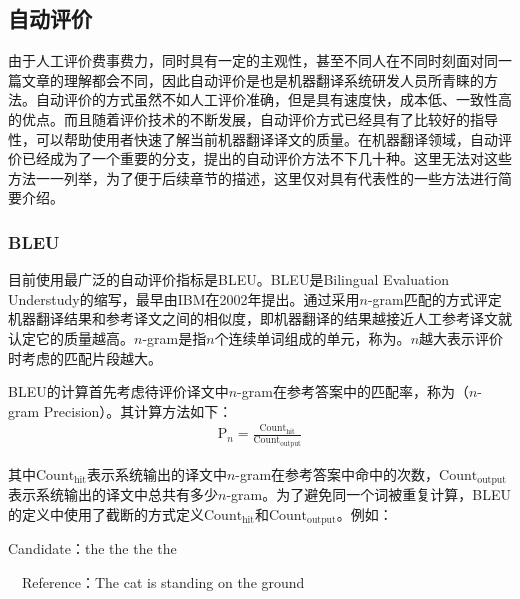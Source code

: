 \subsection{自动评价}

\parinterval 由于人工评价费事费力，同时具有一定的主观性，甚至不同人在不同时刻面对同一篇文章的理解都会不同，因此自动评价是也是机器翻译系统研发人员所青睐的方法。自动评价的方式虽然不如人工评价准确，但是具有速度快，成本低、一致性高的优点。而且随着评价技术的不断发展，自动评价方式已经具有了比较好的指导性，可以帮助使用者快速了解当前机器翻译译文的质量。在机器翻译领域，自动评价已经成为了一个重要的分支，提出的自动评价方法不下几十种。这里无法对这些方法一一列举，为了便于后续章节的描述，这里仅对具有代表性的一些方法进行简要介绍。


\subsubsection{BLEU}

\parinterval 目前使用最广泛的自动评价指标是BLEU。BLEU是Bilingual Evaluation Understudy的缩写，最早由IBM在2002年提出\cite{papineni2002bleu}。通过采用$n$-gram匹配的方式评定机器翻译结果和参考译文之间的相似度，即机器翻译的结果越接近人工参考译文就认定它的质量越高。$n$-gram是指$n$个连续单词组成的单元，称为{\small{}}。$n$越大表示评价时考虑的匹配片段越大。

\parinterval  BLEU的计算首先考虑待评价译文中$n$-gram在参考答案中的匹配率，称为{\small{}}（$n$-gram Precision）。其计算方法如下：
\begin{eqnarray}
\textrm{P}_n=\frac{\textrm{Count}_\textrm{hit}}{\textrm{Count}_{\textrm{output}}}
\label{eq:1-1}
\end{eqnarray}

\parinterval  其中$\textrm{Count}_{\textrm{hit}}$表示系统输出的译文中$n$-gram在参考答案中命中的次数，$\textrm{Count}_{\textrm{output}}$\\表示系统输出的译文中总共有多少$n$-gram。为了避免同一个词被重复计算，BLEU的定义中使用了截断的方式定义$\textrm{Count}_{\textrm{hit}}$和$\textrm{Count}_{\textrm{output}}$。例如：

\begin{example}
Candidate：the the the the

\qquad \qquad \ \  Reference：The cat is standing on the ground
\label{eg:1-1}
\end{example}

